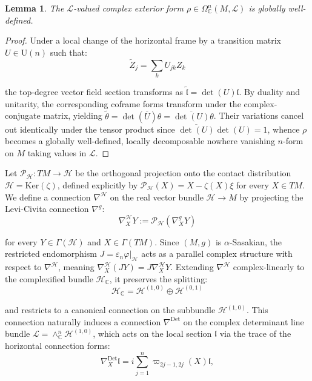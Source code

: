 \documentclass[10pt,a4paper,twoside,reqno]{amsart}
\theoremstyle{plain}
\newtheorem{lemma}[thm]{Lemma}
\theoremstyle{definition}
\theoremstyle{remark}
\def\C{\mathbb{C}}
\renewcommand{\ker}{\mathrm{Ker}}
\begin{document}
\begin{lemma}
The $\mathcal{L}$-valued complex exterior form $\rho\in\Omega^n_\C(M,\mathcal{L})$ is globally well-defined.
\end{lemma}

\begin{proof}
Under a local change of the horizontal frame by a transition matrix $U \in \mathrm{U}(n)$ such that:
\begin{equation*}
\tilde{Z}_j = \sum_k U_{jk} Z_k    
\end{equation*}

\noindent
the top-degree vector field section transforms as $\tilde{\mathfrak{l}} = \det(U) \mathfrak{l}$. By duality and unitarity, the corresponding coframe forms transform under the complex-conjugate matrix, yielding $\tilde{\theta} = \det(\overline{U})\theta = \overline{\det(U)}\theta$. Their variations cancel out identically under the tensor product since $\overline{\det(U)}\det(U) = 1$, whence $\rho$ becomes a globally well-defined, locally decomposable nowhere vanishing $n$-form on $M$ taking values in $\mathcal{L}$.
\end{proof}

Let $\mathcal{P}_{\mathcal{H}} \colon TM \to \mathcal{H}$ be the orthogonal projection onto the contact distribution $\mathcal{H} = \ker(\zeta)$, defined explicitly by $\mathcal{P}_{\mathcal{H}}(X) = X - \zeta(X)\xi$ for every $X\in TM$. We define a connection $\nabla^{\mathcal{H}}$ on the real vector bundle $\mathcal{H} \to M$ by projecting the Levi-Civita connection $\nabla^g$:
\begin{equation*}
\nabla^{\mathcal{H}}_X Y := \mathcal{P}_{\mathcal{H}}(\nabla^g_X Y)
\end{equation*}

\noindent
for every $Y \in \Gamma(\mathcal{H})$ and $X\in \Gamma(TM)$. Since $(M,g)$ is $\alpha$-Sasakian, the restricted endomorphism $J = \varepsilon_n\varphi\vert_{\mathcal{H}}$ acts as a parallel complex structure with respect to $\nabla^{\mathcal{H}}$, meaning $\nabla^{\mathcal{H}}_X (JY) = J \nabla^{\mathcal{H}}_X Y$. Extending $\nabla^{\mathcal{H}}$ complex-linearly to the complexified bundle $\mathcal{H}_{\mathbb{C}}$, it preserves the splitting: 
\begin{equation*}
\mathcal{H}_{\mathbb{C}} = \mathcal{H}^{(1,0)} \oplus \mathcal{H}^{(0,1)}
\end{equation*}

\noindent
and restricts to a canonical connection on the subbundle $\mathcal{H}^{(1,0)}$. This connection naturally induces a connection $\nabla^{\mathrm{Det}}$ on the complex determinant line bundle $\mathcal{L} = \wedge^n_{\mathbb{C}} \mathcal{H}^{(1,0)}$, which acts on the local section $\mathfrak{l}$ via the trace of the horizontal connection forms:
\begin{equation*}
\nabla^{\mathrm{Det}}_X \mathfrak{l} = i \sum_{j=1}^n \varpi_{2j-1,2j}(X) \mathfrak{l},
\end{equation*}
\end{document}
